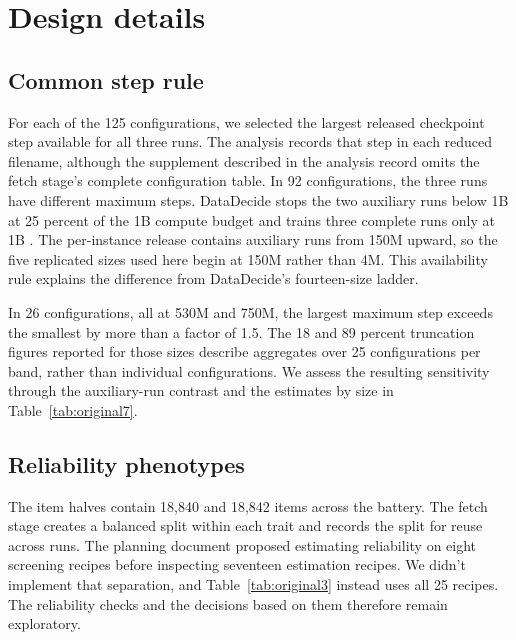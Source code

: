 \section{Design details}
\label{app:design}

\subsection{Common step rule}
For each of the 125 configurations, we selected the largest released checkpoint step available for all three runs. The analysis records that step in each reduced filename, although the supplement described in the analysis record omits the fetch stage's complete configuration table. In 92 configurations, the three runs have different maximum steps. DataDecide stops the two auxiliary runs below 1B at 25 percent of the 1B compute budget and trains three complete runs only at 1B \citep{magnusson2025}. The per-instance release contains auxiliary runs from 150M upward, so the five replicated sizes used here begin at 150M rather than 4M. This availability rule explains the difference from DataDecide's fourteen-size ladder.

In 26 configurations, all at 530M and 750M, the largest maximum step exceeds the smallest by more than a factor of 1.5. The 18 and 89 percent truncation figures reported for those sizes describe aggregates over 25 configurations per band, rather than individual configurations. We assess the resulting sensitivity through the auxiliary-run contrast and the estimates by size in Table~\ref{tab:original7}.

\subsection{Reliability phenotypes}
The item halves contain 18,840 and 18,842 items across the battery. The fetch stage creates a balanced split within each trait and records the split for reuse across runs. The planning document proposed estimating reliability on eight screening recipes before inspecting seventeen estimation recipes. We didn't implement that separation, and Table~\ref{tab:original3} instead uses all 25 recipes. The reliability checks and the decisions based on them therefore remain exploratory.

